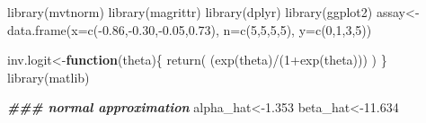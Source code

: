 \documentclass[
]{book}
\newenvironment{Shaded}{\begin{snugshade}}{\end{snugshade}}
\newcommand{\AttributeTok}[1]{\textcolor[rgb]{0.77,0.63,0.00}{#1}}
\newcommand{\ControlFlowTok}[1]{\textcolor[rgb]{0.13,0.29,0.53}{\textbf{#1}}}
\newcommand{\DecValTok}[1]{\textcolor[rgb]{0.00,0.00,0.81}{#1}}
\newcommand{\DocumentationTok}[1]{\textcolor[rgb]{0.56,0.35,0.01}{\textbf{\textit{#1}}}}
\newcommand{\FloatTok}[1]{\textcolor[rgb]{0.00,0.00,0.81}{#1}}
\newcommand{\FunctionTok}[1]{\textcolor[rgb]{0.00,0.00,0.00}{#1}}
\newcommand{\NormalTok}[1]{#1}
\newcommand{\OtherTok}[1]{\textcolor[rgb]{0.56,0.35,0.01}{#1}}
\newcommand{\SpecialCharTok}[1]{\textcolor[rgb]{0.00,0.00,0.00}{#1}}
\theoremstyle{definition}
\theoremstyle{definition}
\theoremstyle{definition}
\theoremstyle{definition}
\theoremstyle{remark}
\begin{document}
\begin{Shaded}
\begin{Highlighting}[]
\FunctionTok{library}\NormalTok{(mvtnorm)}
 \FunctionTok{library}\NormalTok{(magrittr)}
 \FunctionTok{library}\NormalTok{(dplyr)}
 \FunctionTok{library}\NormalTok{(ggplot2)}
\NormalTok{ assay}\OtherTok{\textless{}{-}}\FunctionTok{data.frame}\NormalTok{(}\AttributeTok{x=}\FunctionTok{c}\NormalTok{(}\SpecialCharTok{{-}}\FloatTok{0.86}\NormalTok{,}\SpecialCharTok{{-}}\FloatTok{0.30}\NormalTok{,}\SpecialCharTok{{-}}\FloatTok{0.05}\NormalTok{,}\FloatTok{0.73}\NormalTok{), }\AttributeTok{n=}\FunctionTok{c}\NormalTok{(}\DecValTok{5}\NormalTok{,}\DecValTok{5}\NormalTok{,}\DecValTok{5}\NormalTok{,}\DecValTok{5}\NormalTok{), }\AttributeTok{y=}\FunctionTok{c}\NormalTok{(}\DecValTok{0}\NormalTok{,}\DecValTok{1}\NormalTok{,}\DecValTok{3}\NormalTok{,}\DecValTok{5}\NormalTok{))}

\NormalTok{inv.logit}\OtherTok{\textless{}{-}}\ControlFlowTok{function}\NormalTok{(theta)\{}
  \FunctionTok{return}\NormalTok{( (}\FunctionTok{exp}\NormalTok{(theta)}\SpecialCharTok{/}\NormalTok{(}\DecValTok{1}\SpecialCharTok{+}\FunctionTok{exp}\NormalTok{(theta)))  )}
\NormalTok{\}}
\FunctionTok{library}\NormalTok{(matlib)}

\DocumentationTok{\#\#\# normal approximation}
\NormalTok{ alpha\_hat}\OtherTok{\textless{}{-}}\FloatTok{1.353}
\NormalTok{ beta\_hat}\OtherTok{\textless{}{-}}\FloatTok{11.634}


\end{Highlighting}
\end{Shaded}
\end{document}
